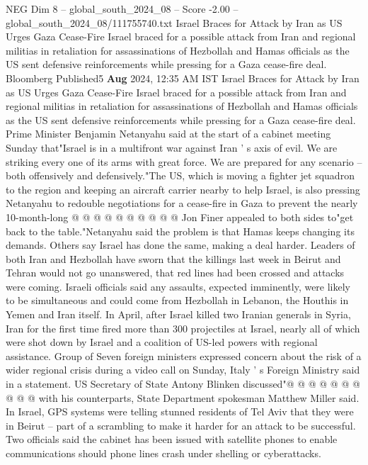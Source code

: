 \begin{textsample}{NEG Dim 8 – global\_south\_2024\_08 – Score -2.00 – global\_south\_2024\_08/111755740.txt}  \label{ex:f8_neg_070}
Israel Braces for Attack by Iran as US Urges Gaza Cease-Fire Israel braced for a possible attack from Iran and regional militias in retaliation for assassinations of Hezbollah and Hamas officials as the US sent defensive reinforcements while pressing for a Gaza cease-fire deal.
Bloomberg Published5 \textbf{Aug} 2024, 12:35 AM IST Israel Braces for Attack by Iran as US Urges Gaza Cease-Fire Israel braced for a possible attack from Iran and regional militias in retaliation for assassinations of Hezbollah and Hamas officials as the US sent defensive reinforcements while pressing for a Gaza cease-fire deal.
Prime Minister Benjamin Netanyahu said at the start of a cabinet meeting Sunday that"Israel is in a multifront war against Iran ' s axis of evil.
We are striking every one of its arms with great force.
We are prepared for any scenario -- both offensively and defensively."The US, which is moving a fighter jet squadron to the region and keeping an aircraft carrier nearby to help Israel, is also pressing Netanyahu to redouble negotiations for a cease-fire in Gaza to prevent the nearly 10-month-long @ @ @ @ @ @ @ @ @ @ Jon Finer appealed to both sides to"get back to the table."Netanyahu said the problem is that Hamas keeps changing its demands.
Others say Israel has done the same, making a deal harder.
Leaders of both Iran and Hezbollah have sworn that the killings last week in Beirut and Tehran would not go unanswered, that red lines had been crossed and attacks were coming.
Israeli officials said any assaults, expected imminently, were likely to be simultaneous and could come from Hezbollah in Lebanon, the Houthis in Yemen and Iran itself.
In April, after Israel killed two Iranian generals in Syria, Iran for the first time fired more than 300 projectiles at Israel, nearly all of which were shot down by Israel and a coalition of US-led powers with regional assistance.
Group of Seven foreign ministers expressed concern about the risk of a wider regional crisis during a video call on Sunday, Italy ' s Foreign Ministry said in a statement.
US Secretary of State Antony Blinken discussed"@ @ @ @ @ @ @ @ @ @ with his counterparts, State Department spokesman Matthew Miller said.
In Israel, GPS systems were telling stunned residents of Tel Aviv that they were in Beirut -- part of a scrambling to make it harder for an attack to be successful.
Two officials said the cabinet has been issued with satellite phones to enable communications should phone lines crash under shelling or cyberattacks.

\end{textsample}
